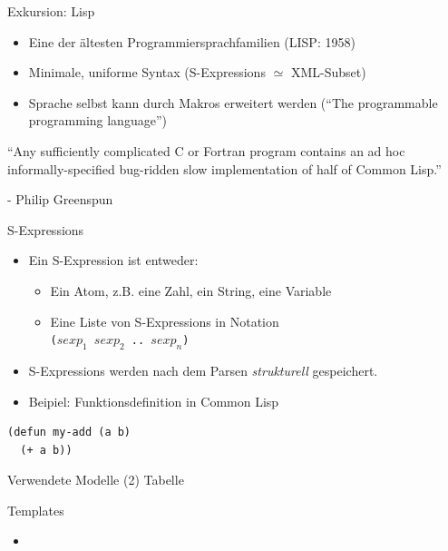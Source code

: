 \documentclass{beamer}
\begin{document}
\begin{frame}{Exkursion: Lisp}
  \begin{itemize}
  \item Eine der ältesten Programmiersprachfamilien (LISP: 1958)
  \item Minimale, uniforme Syntax (S-Expressions $\simeq$ XML-Subset)
  \item Sprache selbst kann durch Makros erweitert werden (``The
    programmable programming language'')
  \end{itemize}

  \begin{block}{}
    ``Any sufficiently complicated C or Fortran program contains an ad hoc
    informally-specified bug-ridden slow implementation of half of
    Common Lisp.''

    - Philip Greenspun
  \end{block}
\end{frame}

\begin{frame}[fragile]{S-Expressions}
  \begin{itemize}
  \item Ein S-Expression ist entweder:
    \begin{itemize}
    \item Ein Atom, z.B. eine Zahl, ein String, eine Variable
    \item Eine Liste von S-Expressions in Notation \\ \texttt{($sexp_1$ $sexp_2$ .. $sexp_n$)}
    \end{itemize}
  \item S-Expressions werden nach dem Parsen \textit{strukturell} gespeichert.
  \item Beipiel: Funktionsdefinition in Common Lisp
  \end{itemize}
\begin{verbatim}
(defun my-add (a b)
  (+ a b))
\end{verbatim}
\end{frame}

\begin{frame}{Verwendete Modelle (2)}
  Tabelle
\end{frame}

\begin{frame}{Templates}
  \begin{itemize}
  \item 
  \end{itemize}
\end{frame}
\end{document}
